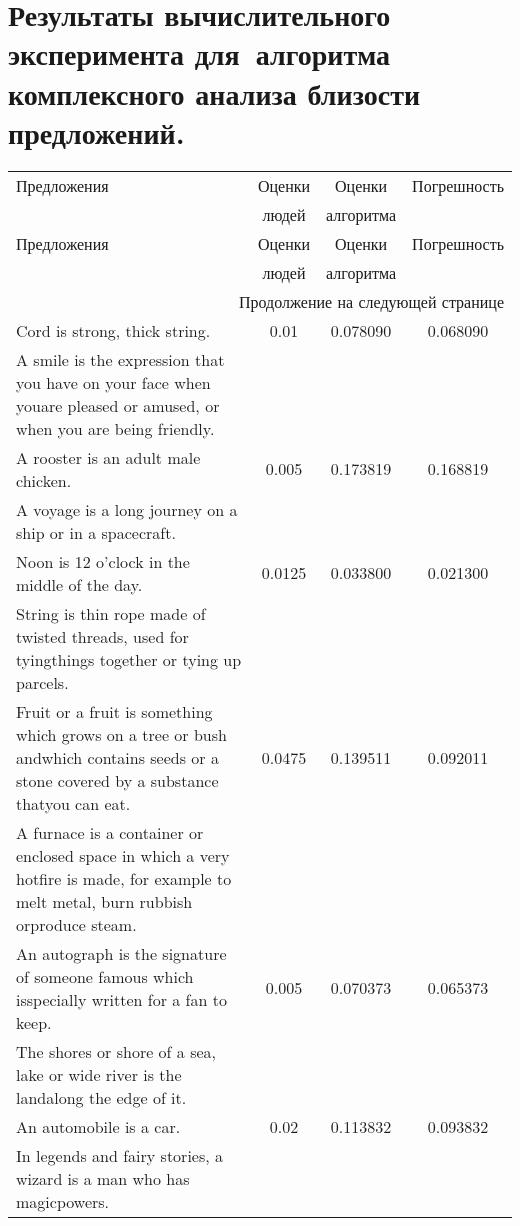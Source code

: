 \appendix

\section*{Результаты вычислительного эксперимента для~алгоритма комплексного анализа близости предложений.}
\label{app:sentence_similarity_table}


\begin{center}
{\Large
\begin{longtable}{|p{9cm}|c|c|c|}
\hline
Предложения & Оценки & Оценки & Погрешность  \\
 & людей & алгоритма &  \\
\hline\endfirsthead
\hline
Предложения & Оценки & Оценки & Погрешность  \\
 & людей & алгоритма &  \\
\hline\endhead
\hline \multicolumn{4}{|r|}{{Продолжение на следующей странице}} \\ \hline
\endfoot
\endlastfoot
Cord is strong, thick string. & 0.01 & 0.078090 & 0.068090 \\
A smile is the expression that you have on your face when youare pleased or amused, or when you are being friendly. & & & \\
\hline
A rooster is an adult male chicken. & 0.005 & 0.173819 & 0.168819 \\
A voyage is a long journey on a ship or in a spacecraft. & & & \\
\hline
Noon is 12 o'clock in the middle of the day. & 0.0125 & 0.033800 & 0.021300 \\
String is thin rope made of twisted threads, used for tyingthings together or tying up parcels. & & & \\
\hline
Fruit or a fruit is something which grows on a tree or bush andwhich contains seeds or a stone covered by a substance thatyou can eat. & 0.0475 & 0.139511 & 0.092011 \\
A furnace is a container or enclosed space in which a very hotfire is made, for example to melt metal, burn rubbish orproduce steam. & & & \\
\hline
An autograph is the signature of someone famous which isspecially written for a fan to keep. & 0.005 & 0.070373 & 0.065373 \\
The shores or shore of a sea, lake or wide river is the landalong the edge of it. & & & \\
\hline
An automobile is a car. & 0.02 & 0.113832 & 0.093832 \\
In legends and fairy stories, a wizard is a man who has magicpowers. & & & \\

\end{longtable}}
\end{center}

